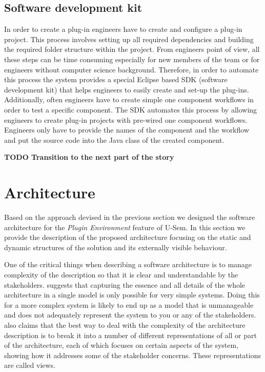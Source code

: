 \subsection{Software development kit}

In order to create a plug-in engineers have to create and configure a plug-in project. This process involves setting up all required dependencies and building the required folder structure within the project. From engineers point of view, all these steps can be time consuming especially for new members of the team or for engineers without computer science background. Therefore, in order to automate this process the system provides a special Eclipse based SDK (software development kit) that helps engineers to easily create and set-up the plug-ins. Additionally, often engineers have to create simple one component workflows in order to test a specific component. The SDK automates this process by allowing engineers to create plug-in projects with pre-wired one component workflows. Engineers only have to provide the names of the component and the workflow and put the source code into the Java class of the created component. 

\textbf{TODO Transition to the next part of the story}

\section{Architecture}
\label{sec:architecturePlugin}

Based on the approach devised in the previous section we designed the software architecture for the \textit{Plugin Environment} feature of U-Sem. In this section we provide the description of the proposed architecture focusing on the static and dynamic structures of the solution and its externally visible behaviour.

One of the critical things when describing a software architecture is to manage complexity of the description so that it is clear and understandable by the stakeholders. \cite{Rozanski} suggests that capturing the essence and all details of the whole architecture in a single model is only possible for very simple systems. Doing this for a more complex system is likely to end up as a model that is unmanageable and does not adequately represent the system to you or any of the stakeholders. \cite{Rozanski} also claims that the best way to deal with the complexity of the architecture description is to break it into a number of different representations of all or part of the architecture, each of which focuses on certain aspects of the system, showing how it addresses some of the stakeholder concerns. These representations are called views.

